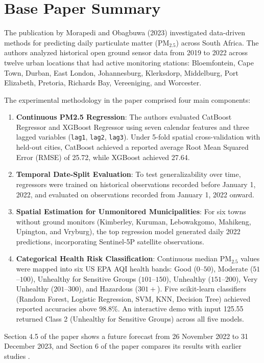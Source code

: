 \section{Base Paper Summary}
The publication by Morapedi and Obagbuwa (2023) \cite{morapedi2023air} investigated data-driven methods for predicting daily particulate matter ($\text{PM}_{2.5}$) across South Africa. The authors analyzed historical open ground sensor data from 2019 to 2022 across twelve urban locations that had active monitoring stations: Bloemfontein, Cape Town, Durban, East London, Johannesburg, Klerksdorp, Middelburg, Port Elizabeth, Pretoria, Richards Bay, Vereeniging, and Worcester.

The experimental methodology in the paper comprised four main components:
\begin{enumerate}
    \item \textbf{Continuous PM2.5 Regression}: The authors evaluated CatBoost Regressor \cite{prokhorenkova2018catboost} and XGBoost Regressor \cite{chen2016xgboost} using seven calendar features and three lagged variables (\texttt{lag1}, \texttt{lag2}, \texttt{lag3}). Under 5-fold spatial cross-validation with held-out cities, CatBoost achieved a reported average Root Mean Squared Error (RMSE) of 25.72, while XGBoost achieved 27.64.
    \item \textbf{Temporal Date-Split Evaluation}: To test generalizability over time, regressors were trained on historical observations recorded before January 1, 2022, and evaluated on observations recorded from January 1, 2022 onward.
    \item \textbf{Spatial Estimation for Unmonitored Municipalities}: For six towns without ground monitors (Kimberley, Kuruman, Lebowakgomo, Mahikeng, Upington, and Vryburg), the top regression model generated daily 2022 predictions, incorporating Sentinel-5P satellite observations.
    \item \textbf{Categorical Health Risk Classification}: Continuous median $\text{PM}_{2.5}$ values were mapped into six US EPA AQI health bands: Good ($0$--$50$), Moderate ($51$--$100$), Unhealthy for Sensitive Groups ($101$--$150$), Unhealthy ($151$--$200$), Very Unhealthy ($201$--$300$), and Hazardous ($301+$). Five scikit-learn classifiers \cite{pedregosa2011scikit} (Random Forest, Logistic Regression, SVM, KNN, Decision Tree) achieved reported accuracies above 98.8\%. An interactive demo with input 125.55 returned Class 2 (Unhealthy for Sensitive Groups) across all five models.
\end{enumerate}

Section 4.5 of the paper shows a future forecast from 26 November 2022 to 31 December 2023, and Section 6 of the paper compares its results with earlier studies \cite{joharestani2019pm25, akiladevi2020prediction}.
